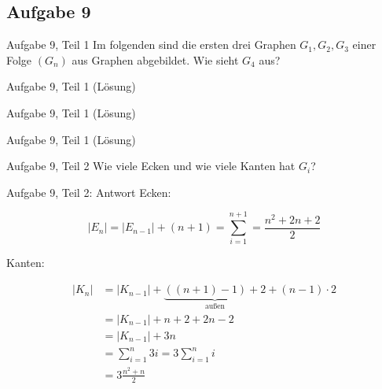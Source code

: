 \subsection{Aufgabe 9}
\begin{frame}{Aufgabe 9, Teil 1}
Im folgenden sind die ersten drei Graphen $G_1, G_2, G_3$ einer
Folge $(G_n)$ aus Graphen abgebildet. Wie sieht $G_4$ aus?

\begin{gallery}
\end{gallery}
\end{frame}

\begin{frame}{Aufgabe 9, Teil 1 (Lösung)}
    \begin{center}
        
    \end{center}
\end{frame}

\begin{frame}{Aufgabe 9, Teil 1 (Lösung)}
    \begin{center}
        
    \end{center}
\end{frame}

\begin{frame}{Aufgabe 9, Teil 1 (Lösung)}
    \begin{center}
        
    \end{center}
\end{frame}

\begin{frame}{Aufgabe 9, Teil 2}
Wie viele Ecken und wie viele Kanten hat $G_i$?

\begin{gallery}
\end{gallery}
\end{frame}

\begin{frame}{Aufgabe 9, Teil 2: Antwort}
Ecken:

\[|E_n| = |E_{n-1}| + (n+1) = \sum_{i=1}^{n+1} = \frac{n^2 + 2n+2}{2}\]

Kanten:

\begin{align}
|K_n| &= |K_{n-1}| + \underbrace{((n+1)-1)+2}_{\text{außen}} + (n-1) \cdot 2\\
    &= |K_{n-1}| + n+2+2n-2\\
    &= |K_{n-1}| + 3n\\
    &= \sum_{i=1}^{n} 3i = 3 \sum_{i=1}^{n} i \\
    &= 3 \frac{n^2 + n}{2}
\end{align}
\end{frame}

